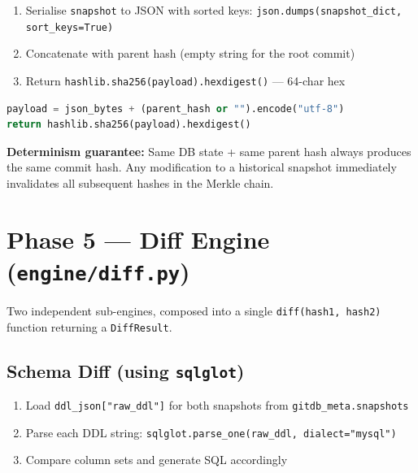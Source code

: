 \documentclass[12pt, a4paper]{article}
\begin{document}
\begin{enumerate}[leftmargin=1.5em, itemsep=0.3em]
    \item Serialise \texttt{snapshot} to JSON with sorted keys:
    \texttt{json.dumps(snapshot\_dict, sort\_keys=True)}
    \item Concatenate with parent hash (empty string for the root commit)
    \item Return \texttt{hashlib.sha256(payload).hexdigest()} --- 64-char hex
\end{enumerate}

\begin{tcolorbox}[commandbox, title=Hash Construction]
\begin{lstlisting}[language=Python]
payload = json_bytes + (parent_hash or "").encode("utf-8")
return hashlib.sha256(payload).hexdigest()
\end{lstlisting}
\end{tcolorbox}

\begin{tcolorbox}[infobox]
\textbf{Determinism guarantee:} Same DB state + same parent hash always
produces the same commit hash. Any modification to a historical snapshot
immediately invalidates all subsequent hashes in the Merkle chain.
\end{tcolorbox}

\section{Phase 5 --- Diff Engine (\texttt{engine/diff.py})}

Two independent sub-engines, composed into a single \texttt{diff(hash1, hash2)}
function returning a \texttt{DiffResult}.

\subsection{Schema Diff (using \texttt{sqlglot})}

\begin{enumerate}[leftmargin=1.5em, itemsep=0.3em]
    \item Load \texttt{ddl\_json["raw\_ddl"]} for both snapshots from
    \texttt{gitdb\_meta.snapshots}
    \item Parse each DDL string:
    \texttt{sqlglot.parse\_one(raw\_ddl, dialect="mysql")}
    \item Compare column sets and generate SQL accordingly
\end{enumerate}
\end{document}
